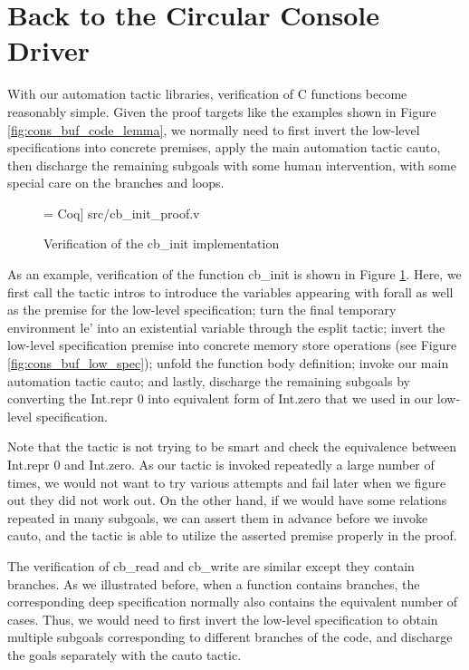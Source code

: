 \section{Back to the Circular Console Driver}

With our automation tactic libraries, verification of C functions become
reasonably simple.  Given the proof targets like the examples shown
in Figure \ref{fig:cons_buf_code_lemma}, we normally need to first
invert the low-level specifications into concrete premises, apply
the main automation tactic \textsf{cauto}, then discharge the remaining
subgoals with some human intervention, with some special care on the
branches and loops.

\begin{figure}
 = Coq] {src/cb_init_proof.v}
\caption{Verification of the \textsf{cb\_init} implementation}
\label{fig:cb_init_proof}
\end{figure}

As an example, verification of the function \textsf{cb\_init} is shown
in Figure \ref{fig:cb_init_proof}. Here, we first call the tactic \textsf{intros}
to introduce the variables appearing with \textsf{forall} as well as the
premise for the low-level specification; turn the final temporary environment
\textsf{le'} into an existential variable through the \textsf{esplit} tactic;
invert the low-level specification premise into concrete memory
store operations (see Figure \ref{fig:cons_buf_low_spec});
unfold the function body definition; invoke our main automation
tactic \textsf{cauto}; and lastly, discharge the remaining subgoals
by converting the \textsf{Int.repr 0} into equivalent form of \textsf{Int.zero}
that we used in our low-level specification.

Note that the tactic is not trying to be smart and check the equivalence between
\textsf{Int.repr 0} and \textsf{Int.zero}. As our tactic is invoked repeatedly a
large number of times, we would not want to try various attempts and
fail later when we figure out they did not work out. On the other hand, if
we would have some relations repeated in many subgoals, we can assert
them in advance before we invoke \textsf{cauto}, and the tactic is able
to utilize the asserted premise properly in the proof.

The verification of \textsf{cb\_read} and \textsf{cb\_write} are similar except
they contain branches. As we illustrated before, when a function contains
branches, the corresponding deep specification normally also contains the equivalent
number of cases. Thus, we would need to first invert the low-level specification
to obtain multiple subgoals corresponding to different branches of the code,
and discharge the goals separately with the \textsf{cauto} tactic.

